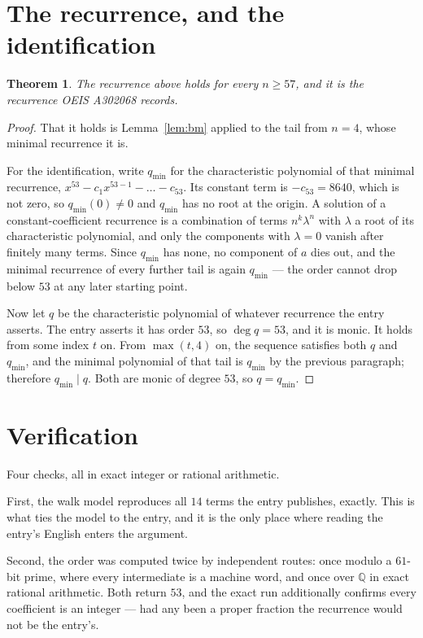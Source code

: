\documentclass[11pt,a4paper]{article}
\theoremstyle{plain}
\newtheorem{theorem}{Theorem}
\theoremstyle{definition}
\begin{document}
\section{The recurrence, and the identification}

\begin{theorem}
The recurrence above holds for every $n\ge57$, and it is the recurrence OEIS A302068 records.
\end{theorem}

\begin{proof}
That it holds is Lemma~\ref{lem:bm} applied to the tail from $n=4$, whose minimal
recurrence it is.

For the identification, write $q_{\min}$ for the characteristic polynomial of that minimal
recurrence, $x^{53}-c_1x^{53-1}-\dots-c_{53}$. Its constant term is
$-c_{53}=8640$, which is not zero, so $q_{\min}(0)\neq0$ and $q_{\min}$ has no
root at the origin. A solution of a constant-coefficient recurrence is a combination of terms
$n^{k}\lambda^{n}$ with $\lambda$ a root of its characteristic polynomial, and only the
components with $\lambda=0$ vanish after finitely many terms. Since $q_{\min}$ has none, no
component of $a$ dies out, and the minimal recurrence of every further tail is again
$q_{\min}$ --- the order cannot drop below $53$ at any later starting point.

Now let $q$ be the characteristic polynomial of whatever recurrence the entry asserts. The
entry asserts it has order $53$, so $\deg q=53$, and it is monic. It holds from some
index $t$ on. From $\max(t,4)$ on, the sequence satisfies both $q$ and $q_{\min}$, and
the minimal polynomial of that tail is $q_{\min}$ by the previous paragraph; therefore
$q_{\min}\mid q$. Both are monic of degree $53$, so $q=q_{\min}$.
\end{proof}

\section{Verification}

Four checks, all in exact integer or rational arithmetic.

First, the walk model reproduces all $14$ terms the entry publishes, exactly. This is
what ties the model to the entry, and it is the only place where reading the entry's English
enters the argument.

Second, the order was computed twice by independent routes: once modulo a $61$-bit prime, where
every intermediate is a machine word, and once over $\mathbb{Q}$ in exact rational arithmetic.
Both return $53$, and the exact run additionally confirms every coefficient is an integer
--- had any been a proper fraction the recurrence would not be the entry's.
\end{document}
